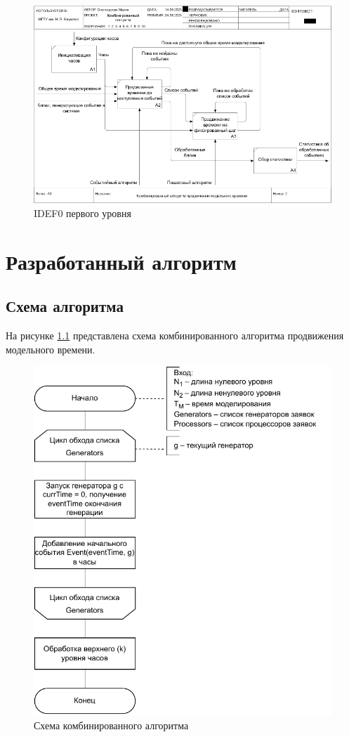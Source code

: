 \documentclass{bmstu}
\begin{document}
\begin{figure}[h!btp]
	\centering
	\includegraphics[width=1\columnwidth]{inc/img/IDEF0-A1.png}
	\caption{IDEF0 первого уровня}
	\label{img:IDEF0-A1}	
\end{figure}


\chapter{Разработанный алгоритм}
\section{Схема алгоритма}
На рисунке \ref{img:hybrid_simulate_schema} представлена схема комбинированного алгоритма продвижения модельного времени. 
\begin{figure}[h!btp]
	\centering
	\includegraphics[width=1\columnwidth]{inc/img/hybrid_simulate_schema.pdf}
	\caption{Схема комбинированного алгоритма}
	\label{img:hybrid_simulate_schema}	
\end{figure}
\end{document}
